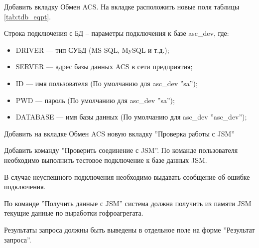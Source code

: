 
Добавить вкладку Обмен ACS. 
На вкладке расположить новые поля таблицы \ref{tab:tdb_eqpt}.

Строка подключения с БД – параметры подключения к базе asc\_dev, где:
 \begin{itemize}
     \item DRIVER –-- тип СУБД (MS SQL, MySQL и т.д.);
     \item SERVER --– адрес базы данных ACS в сети предприятия;
     \item ID –-- имя пользователя (По умолчанию  для asc\_dev ''sa'');
     \item PWD –-- пароль (По умолчанию  для asc\_dev ''sa'');
     \item DATABASE –-- имя базы данных (По умолчанию для asc\_dev ''asc\_dev'');
\end{itemize}

Добавить на вкладке Обмен ACS новую вкладку ''Проверка работы с JSM''




Добавить команду ''Проверить соединение с JSM''.
По команде пользователя необходимо выполнить тестовое подключение к базе данных JSM.

В случае неуспешного подключения необходимо выдавать сообщение об ошибке подключения.




По команде ''Получить данные с JSM'' система должна получить из памяти JSM текущие данные по выработки 
гофроагрегата. 

Результаты запроса должны быть выведены в отдельное поле на форме ''Результат запроса''.